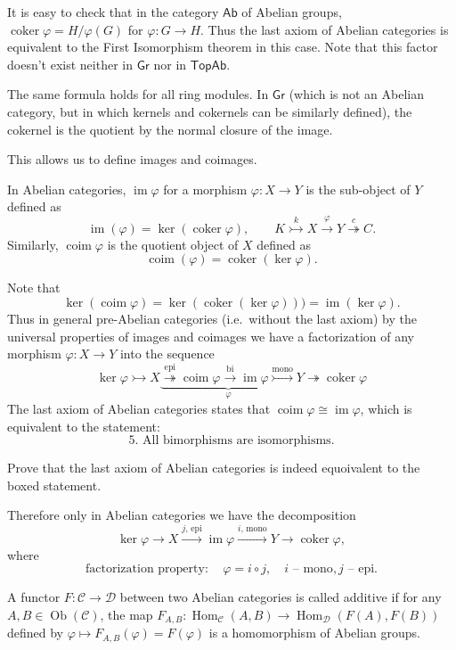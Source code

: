 \documentclass[english,letterpaper]{article}%
\numberwithin{equation}{section}
\numberwithin{figure}{section}
\numberwithin{table}{section}
\theoremstyle{definition}
\theoremstyle{definition}
\theoremstyle{definition}
\theoremstyle{plain}
\theoremstyle{plain}
\theoremstyle{plain}
\theoremstyle{plain}
\theoremstyle{remark}
\theoremstyle{remark}
\newcommand{\calC}{\mathcal{C}}
\newcommand{\calD}{\mathcal{D}}
\DeclareMathOperator{\ob}{Ob}
\DeclareMathOperator{\im}{im}
\DeclareMathOperator{\Hom}{Hom}
\DeclareMathOperator{\coker}{coker}
\DeclareMathOperator{\coim}{coim}
\begin{document}
\begin{example}
    It is easy to check that in the category $\mathsf{Ab}$ of Abelian groups, $\coker\varphi=H/\varphi(G)$ for $\varphi:G\to H$. Thus the last axiom of Abelian categories is equivalent to the First Isomorphism theorem in this case. Note that this factor doesn't exist neither in $\mathsf{Gr}$ nor in $\mathsf{TopAb}$.
    
    The same formula holds for all ring modules. In $\mathsf{Gr}$ (which is not an Abelian category, but in which kernels and cokernels can be similarly defined), the cokernel is the quotient by the normal closure of the image.
\end{example}

This allows us to define images and coimages.

\begin{defn}
    In Abelian categories, $\im\varphi$ for a morphism $\varphi:X\to Y$ is the sub-object of $Y$ defined as
    \[\im(\varphi)=\ker(\coker\varphi),\quad\quad K\overset k \rightarrowtail X\overset\varphi\to Y\overset c\twoheadrightarrow C.\]
    Similarly, $\coim\varphi$ is the quotient object of $X$ defined as 
    \[\coim(\varphi)=\coker(\ker\varphi).\]
\end{defn}

Note that
\[\ker(\coim\varphi)=\ker(\coker(\ker\varphi)))=\im(\ker\varphi).\]
Thus in general pre-Abelian categories (i.e.\ without the last axiom) by the universal properties of images and coimages we have a factorization of any morphism $\varphi:X\to Y$ into the sequence
\[\ker\varphi\rightarrowtail X\underbrace{\overset{\text{epi}}\twoheadrightarrow\coim\varphi\overset{\text{bi}}\to\im\varphi\overset{\text{mono}}\rightarrowtail}_\varphi Y\twoheadrightarrow\coker\varphi \]
The last axiom of Abelian categories states that $\coim\varphi\cong \im\varphi$, which is equivalent to the statement:
\[\boxed{\text{5. All bimorphisms are isomorphisms.}}\]
\begin{xca}
    Prove that the last axiom of Abelian categories is indeed equoivalent to the boxed statement.
\end{xca}
Therefore only in Abelian categories we have the decomposition
\[\ker\varphi\to X \overset{j\text{, epi}}\longrightarrow\im\varphi\overset{i\text{, mono}}\longrightarrow Y\to \coker\varphi,\]
where
\[\text{factorization property}:\quad \varphi=i\circ j,\quad i\text{ -- mono}, j\text{ -- epi}.\]

\begin{defn}
    A functor $F:\calC\to\calD$ between two Abelian categories is called additive if for any $A,B\in\ob(\calC)$, the map $F_{A,B}:\Hom_\calC(A,B)\to \Hom_\calD(F(A),F(B))$ defined by $\varphi\mapsto F_{A,B}(\varphi)=F(\varphi)$ is a homomorphism of Abelian groups.
\end{defn}
\end{document}
